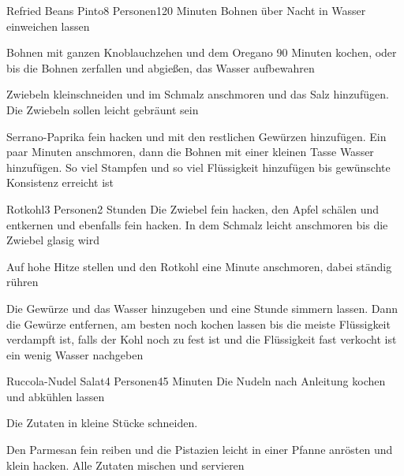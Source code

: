 
\begin{recipe}{Refried Beans Pinto}{8 Personen}{120 Minuten}
Bohnen über Nacht in Wasser einweichen lassen

Bohnen mit ganzen Knoblauchzehen und dem Oregano 90 Minuten kochen, oder bis die Bohnen zerfallen und abgießen, das Wasser aufbewahren

Zwiebeln kleinschneiden und im Schmalz anschmoren und das Salz hinzufügen. Die Zwiebeln sollen leicht gebräunt sein

Serrano-Paprika fein hacken und mit den restlichen Gewürzen hinzufügen.
Ein paar Minuten anschmoren, dann die Bohnen mit einer kleinen Tasse Wasser hinzufügen.
So viel Stampfen und so viel Flüssigkeit hinzufügen bis gewünschte Konsistenz erreicht ist
\end{recipe}


\begin{recipe}{Rotkohl}{3 Personen}{2 Stunden}
Die Zwiebel fein hacken, den Apfel schälen und entkernen und ebenfalls fein hacken. In dem Schmalz leicht anschmoren bis die Zwiebel glasig wird

Auf hohe Hitze stellen und den Rotkohl eine Minute anschmoren, dabei ständig rühren

Die Gewürze  und das Wasser hinzugeben und eine Stunde simmern lassen. Dann die Gewürze entfernen, am besten noch kochen lassen bis die meiste Flüssigkeit verdampft ist, falls der Kohl noch zu fest ist und die Flüssigkeit fast verkocht ist ein wenig Wasser nachgeben
\end{recipe}


\begin{recipe}{Ruccola-Nudel Salat}{4 Personen}{45 Minuten}
Die Nudeln nach Anleitung kochen und abkühlen lassen
 
Die Zutaten in kleine Stücke schneiden.

Den Parmesan fein reiben und die Pistazien leicht in einer Pfanne anrösten und klein hacken. Alle Zutaten mischen und servieren
\end{recipe}

